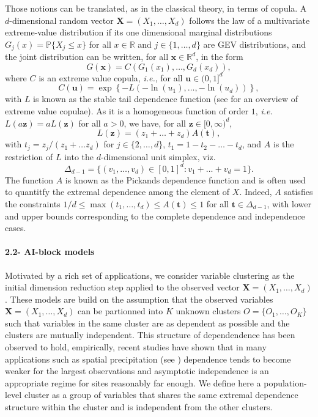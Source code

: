 \documentclass[11pt]{article}
\begin{document}
	Those notions can be translated, as in the classical theory, in terms of copula. A $d$-dimensional random vector $\textbf{X} = (X_1, \dots, X_d)$ follows the law of a multivariate extreme-value distribution if its one dimensional marginal distributions $G_j(x) = \mathbb{P}\{X_j \leq x\}$ for all $x \in \mathbb{R}$ and $j \in \{1,\dots,d\}$ are GEV distributions, and the joint distribution can be written, for all $\textbf{x} \in \mathbb{R}^d$, in the form
	\begin{equation}
	\label{eq:ev_cop}
		G(\textbf{x}) = C\left(G_1(x_1), \dots, G_d(x_d)\right),
	\end{equation}
	where $C$ is an extreme value copula, \emph{i.e.}, for all $\textbf{u} \in (0,1]^d$
	\begin{equation*}
		C(\textbf{u}) = \exp\left\{-L\left(-\ln(u_1), \dots, -\ln(u_d)\right)\right\},
	\end{equation*}
	with $L$ is known as the stable tail dependence function (see \cite{gudendorf2010} for an overview of extreme value copulae). As it is a homogeneous function of order $1$, \emph{i.e.} $L(a\textbf{z}) = a L(\textbf{z})$ for all $a > 0$, we have, for all $\textbf{z} \in [0,\infty)^d$,
	\begin{equation*}
		L(\textbf{z}) = (z_1 + \dots + z_d)A(\textbf{t}),
	\end{equation*}
	with $t_j = z_j / (z_1 + \dots z_d)$ for $j \in \{2,\dots,d\}$, $t_1 = 1-t_2-\dots-t_d$, and $A$ is the restriction of $L$ into the $d$-dimensional unit simplex, viz.
	\begin{equation*}
		\Delta_{d-1} = \{(v_1, \dots, v_d) \in [0,1]^d : v_1 + \dots + v_d = 1\}.
	\end{equation*}
	The function $A$ is known as the Pickands dependence function and is often used to quantitfy the extremal dependence among the element of $X$. Indeed, $A$ satisfies the constraints $1/d \leq \max(t_1, \dots, t_d) \leq A(\textbf{t}) \leq 1$ for all $\textbf{t} \in \Delta_{d-1}$, with lower and upper bounds corresponding to the complete dependence and independence cases.
	
	\paragraph{2.2- AI-block models} Motivated by a rich set of applications, we consider variable clustering as the initial dimension reduction step applied to the observed vector $\textbf{X} = (X_1, \dots, X_d)$. These models are build on the assumption that the observed variables $\textbf{X} = (X_1,\dots, X_d)$ can be partionned into $K$ unknown clusters $O = \{O_1, \dots, O_K\}$ such that variables in the same cluster are as dependent as possible and the clusters are mutually independent. This structure of dependendence has been observed to hold, empirically, recent studies have shown that in many applications such as spatial precipitation (see \cite{le2018dependence, lalancette2021rank}) dependence tends to become weaker for the largest observations and asymptotic independence is an appropriate regime for sites reasonably far enough. We define here a population-level cluster as a group of variables that shares the same extremal dependence structure within the cluster and is independent from the other clusters.
	 
\end{document}
